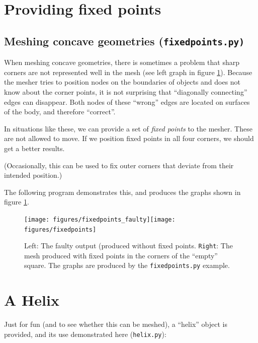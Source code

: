 \documentclass[10pt,a4paper]{book}
\newcommand{\py}[1]{\texttt{\color{blue}#1}}
\begin{document}
\section{Providing fixed points}


\subsection{Meshing concave geometries (\texttt{fixedpoints.py)}}
\label{sec:concavegeometries}

When meshing concave geometries, there is sometimes a problem that
sharp corners are not represented well in the mesh (see left graph in
figure \ref{fig:fixedpoints}). Because the mesher tries to position
nodes on the boundaries of objects and does not know about the corner
points, it is not surprising that ``diagonally connecting'' edges can
disappear. Both nodes of these ``wrong'' edges are located on surfaces of the body, and therefore ``correct''. 

In situations like these, we can provide a set of \emph{fixed points} to the mesher. These are not allowed to move. If we position fixed points in all four corners, we should get a better results. 

(Occasionally, this can be used to fix outer corners that deviate from their intended position.)

The following program demonstrates this, and produces the graphs shown in figure \ref{fig:fixedpoints}.



\begin{figure}[tbhp]
\centerline{\texttt{[image: figures/fixedpoints\_faulty]}\hspace{3cm}\texttt{[image: figures/fixedpoints]}}
\caption{\label{fig:fixedpoints} Left: The faulty output (produced without fixed points. \texttt{Right}: The mesh produced with fixed points in the corners of the ``empty'' square. The graphs are produced by the \py{fixedpoints.py} example.}
\end{figure}


\section{A Helix}

Just for fun (and to see whether this can be meshed), a ``helix'' object is provided, and its use demonstrated here (\texttt{helix.py}):

\end{document}
